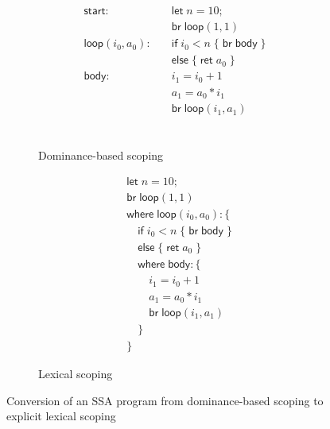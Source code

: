 \documentclass[acmsmall,screen,review]{acmart}
\newcommand{\ms}[1]{\ensuremath{\mathsf{#1}}}
\begin{document}
\begin{figure}
  \centering
  \begin{subfigure}[t]{.5\textwidth}
    \begin{align*}
      \ms{start}:\quad            & \ms{let}\;n = 10; \\
                                  & \ms{br}\;\ms{loop}(1, 1) \\
      \ms{loop}(i_0, a_0): \quad  & \ms{if}\;i_0 < n\; \{\;\ms{br}\;\ms{body}\;\} \\
                                  & \ms{else}\;\{\;\ms{ret}\;a_0\;\} \\
      \ms{body}: \quad            & i_1 = i_0 + 1 \\
                                  & a_1 = a_0 * i_1 \\
                                  & \ms{br}\;\ms{loop}(i_1, a_1) \\ \\ \\ \\ 
    \end{align*}
    \caption{Dominance-based scoping}
  \end{subfigure}%
  \begin{subfigure}[t]{.5\textwidth}
    \begin{align*}
      & \ms{let}\;n = 10; \\
      & \ms{br}\;\ms{loop}(1, 1) \\
      & \ms{where}\;\ms{loop}(i_0, a_0): \{ \\
      & \quad \ms{if}\;i_0 < n\;\{\;\ms{br}\;\ms{body}\;\} \\
      & \quad \ms{else}\;\{\;\ms{ret}\;a_0\;\} \\
      & \quad \ms{where}\;\ms{body}: \{\\ 
      & \qquad i_1 = i_0 + 1 \\
      & \qquad a_1 = a_0 * i_1 \\
      & \qquad \ms{br}\;\ms{loop}(i_1, a_1) \\
      & \quad \} \\
      & \}
    \end{align*}
    \caption{Lexical scoping}
  \end{subfigure}
  \caption{Conversion of an SSA program from dominance-based scoping to explicit lexical scoping}
  \Description{}
\end{figure}
\end{document}

